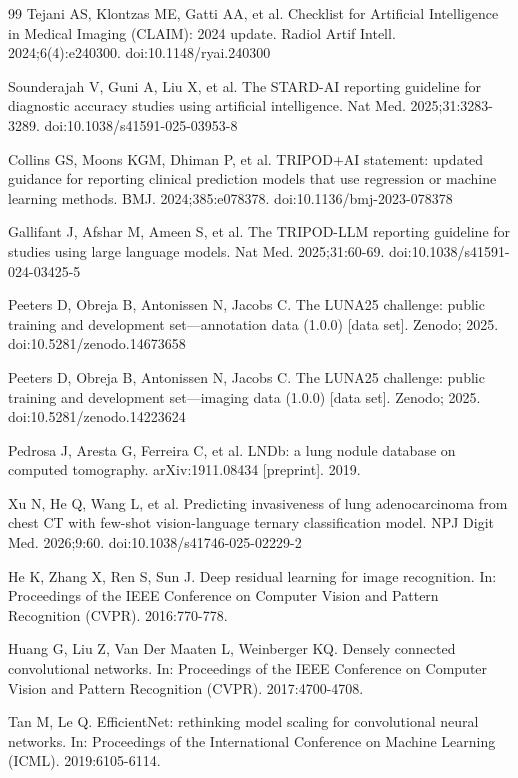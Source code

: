 \documentclass[11pt]{article}
\begin{document}
\begin{thebibliography}{99}
Tejani AS, Klontzas ME, Gatti AA, et al. Checklist for Artificial Intelligence in Medical Imaging (CLAIM): 2024 update. Radiol Artif Intell. 2024;6(4):e240300. doi:10.1148/ryai.240300

Sounderajah V, Guni A, Liu X, et al. The STARD-AI reporting guideline for diagnostic accuracy studies using artificial intelligence. Nat Med. 2025;31:3283-3289. doi:10.1038/s41591-025-03953-8

Collins GS, Moons KGM, Dhiman P, et al. TRIPOD+AI statement: updated guidance for reporting clinical prediction models that use regression or machine learning methods. BMJ. 2024;385:e078378. doi:10.1136/bmj-2023-078378

Gallifant J, Afshar M, Ameen S, et al. The TRIPOD-LLM reporting guideline for studies using large language models. Nat Med. 2025;31:60-69. doi:10.1038/s41591-024-03425-5

Peeters D, Obreja B, Antonissen N, Jacobs C. The LUNA25 challenge: public training and development set---annotation data (1.0.0) [data set]. Zenodo; 2025. doi:10.5281/zenodo.14673658

Peeters D, Obreja B, Antonissen N, Jacobs C. The LUNA25 challenge: public training and development set---imaging data (1.0.0) [data set]. Zenodo; 2025. doi:10.5281/zenodo.14223624

Pedrosa J, Aresta G, Ferreira C, et al. LNDb: a lung nodule database on computed tomography. arXiv:1911.08434 [preprint]. 2019.

Xu N, He Q, Wang L, et al. Predicting invasiveness of lung adenocarcinoma from chest CT with few-shot vision-language ternary classification model. NPJ Digit Med. 2026;9:60. doi:10.1038/s41746-025-02229-2

He K, Zhang X, Ren S, Sun J. Deep residual learning for image recognition. In: Proceedings of the IEEE Conference on Computer Vision and Pattern Recognition (CVPR). 2016:770-778.

Huang G, Liu Z, Van Der Maaten L, Weinberger KQ. Densely connected convolutional networks. In: Proceedings of the IEEE Conference on Computer Vision and Pattern Recognition (CVPR). 2017:4700-4708.

Tan M, Le Q. EfficientNet: rethinking model scaling for convolutional neural networks. In: Proceedings of the International Conference on Machine Learning (ICML). 2019:6105-6114.


\end{thebibliography}
\end{document}
